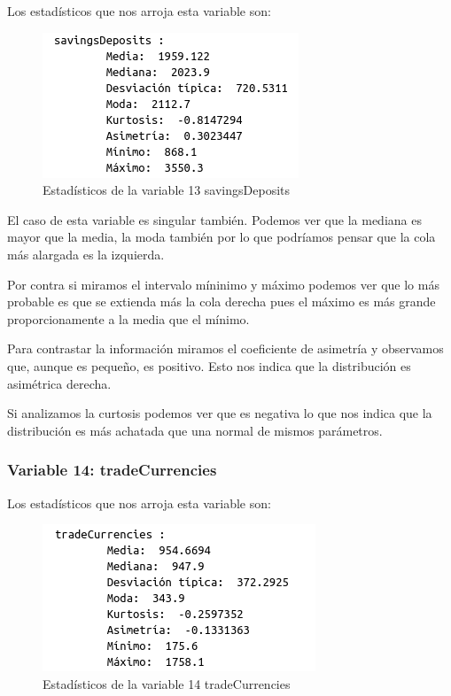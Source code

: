 \documentclass[12pt,a4paper]{article}
\begin{document}
Los estadísticos que nos arroja esta variable son:

\begin{figure}[H]
	\centering
	\includegraphics[scale=0.7]{./Imagenes/EDA/Regresion/estadisticos_savingsDeposits.png}
	\caption{Estadísticos de la variable 13 savingsDeposits}
\end{figure}

El caso de esta variable es singular también. Podemos ver que la mediana es mayor que la media, la moda también por lo que podríamos pensar que la cola más alargada es la izquierda. 

Por contra si miramos el intervalo míninimo y máximo podemos ver que lo más probable es que se extienda más la cola derecha pues el máximo es más grande proporcionamente a la media que el mínimo. 

Para contrastar la información miramos el coeficiente de asimetría y observamos que, aunque es pequeño, es positivo. Esto nos indica que la distribución es asimétrica derecha.

Si analizamos la curtosis podemos ver que es negativa lo que nos indica que la distribución es más achatada que una normal de mismos parámetros.

\subsubsection*{Variable 14: tradeCurrencies}

Los estadísticos que nos arroja esta variable son:

\begin{figure}[H]
	\centering
	\includegraphics[scale=0.7]{./Imagenes/EDA/Regresion/estadisticos_tradeCurrencies.png}
	\caption{Estadísticos de la variable 14 tradeCurrencies}
\end{figure}
\end{document}
